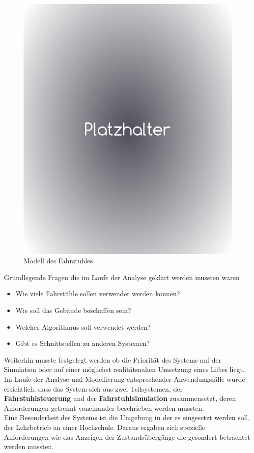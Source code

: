 \begin{figure}[hbt]
	\includegraphics[width=\textwidth /2]{images/platzhalter.png}
	\caption{Modell des Fahrstuhles}
	\label{fig:Pappfahrstuhl}
\end{figure}
Grundlegende Fragen die im Laufe der Analyse geklärt werden mussten waren
\begin{itemize}
	\item Wie viele Fahrstühle sollen verwendet werden können?
	\item Wie soll das Gebäude beschaffen sein?
	\item Welcher Algorithmus soll verwendet werden?
	\item Gibt es Schnittstellen zu anderen Systemen?
\end{itemize}
Weiterhin musste festgelegt werden ob die Priorität des Systems auf der 
Simulation oder auf einer möglichst realitätsnahen Umsetzung eines Liftes liegt.
Im Laufe der Analyse und Modellierung entsprechender Anwendungsfälle 
wurde ersichtlich, dass das System sich aus zwei Teilsystemen, der 
\textbf{Fahrstuhlsteuerung} und der \textbf{Fahrstuhlsimulation} zusammensetzt, 
deren Anforderungen getrennt voneinander beschrieben werden mussten.\\
Eine Besonderheit des Systems ist die Umgebung in der es eingesetzt werden 
soll, der Lehrbetrieb an einer Hochschule. Daraus ergaben sich spezielle 
Anforderungen wie das Anzeigen der Zustandsübergänge die gesondert betrachtet 
werden mussten.

